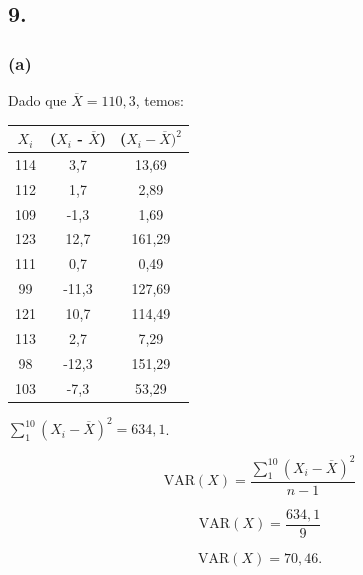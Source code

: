 \documentclass[hidelinks,11pt]{book}
\theoremstyle{definition}
\begin{document}
	\subsection*{9.}

	\subsubsection{(a)}
Dado que $\overline{X}= 110,3$, temos:
	\begin{center}
	\begin{tabular}{|c|c|c|}\hline
	$X_i$ & ($X_i$ - $\overline{X}$) &($X_i - \overline{X})^2$  \\\hline
	114  & 3,7 & 13,69 \\\hline
	112 & 1,7 & 2,89 \\\hline
	109 & -1,3 & 1,69 \\\hline
	123 & 12,7 & 161,29 \\\hline
	111 & 0,7 & 0,49 \\\hline
	99 & -11,3 & 127,69 \\\hline
	121 & 10,7 & 114,49 \\\hline
	113 & 2,7 & 7,29 \\\hline
	98 & -12,3 & 151,29 \\\hline
	103 & -7,3 & 53,29 \\\hline 
	\end{tabular}
\end{center}

$\sum_{1}^{10} (X_i - \overline{X})^2 = 634,1$. 


\begin{displaymath}
	\textrm{VAR}(X) = \frac{\sum_{1}^{10} (X_i - \overline{X})^2 }{n-1}
\end{displaymath}

\begin{displaymath}
	\textrm{VAR}(X) = \frac{634,1 }{9}
\end{displaymath}

\begin{displaymath}
	\textrm{VAR}(X) = 70,46.
\end{displaymath}
\end{document}
